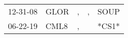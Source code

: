 \begin{supertabular}{p{0.07\textwidth}p{0.06\textwidth}p{0.02\textwidth}p{0.02\textwidth}p{0.06\textwidth}}
 12-31-08\textsuperscript{} &  GLOR\textsuperscript{} &  , &  , &  SOUP\textsuperscript{} \\
 06-22-19\textsuperscript{} &  CML8\textsuperscript{} &  , &    &                   *CS1* \\
\end{supertabular}
